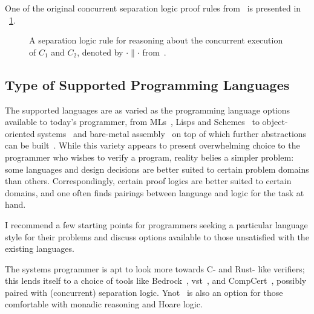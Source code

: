 One of the original concurrent separation logic proof rules
from~\cite{O_Hearn_2007} is presented in \figurename~\ref{F:CSL_ex}.

\begin{figure}
    \centering
    \caption{A separation logic rule for reasoning about the concurrent
    execution of \(C_1\) and \(C_2\), denoted by \(\cdot \parallel \cdot\)
    from~\cite{O_Hearn_2007}.}\label{F:CSL_ex}
\end{figure}

\subsection{Type of Supported Programming Languages}\label{S:t_pl}

The supported languages are as varied as the programming language options
available to today's programmer, from MLs~\cite{Coq,Kumar_2014}, Lisps and
Schemes~\cite{Torlak_2013} to object-oriented
systems~\cite{leino2008specification,leino2010dafny} and bare-metal
assembly~\cite{Chlipala_2011} on top of which further abstractions can be
built~\cite{Chlipala_2015}. While this variety appears to present overwhelming
choice to the programmer who wishes to verify a program, reality belies a
simpler problem: some languages and design decisions are better suited to
certain problem domains than others. Correspondingly, certain proof logics are
better suited to certain domains, and one often finds pairings between language
and logic for the task at hand.

I recommend a few starting points for programmers seeking a particular language
style for their problems and discuss options available to those unsatisfied with
the existing languages.

The systems programmer is apt to look more towards C- and Rust- like verifiers; this
lends itself to a choice of tools like Bedrock~\cite{Chlipala_2011},
\gls{vst}~\cite{VST}, and CompCert~\cite{Kastner-LBSSF-2017}, possibly paired
with (concurrent) separation logic. Ynot~\cite{Nanevski08ynot:reasoning} is also
an option for those comfortable with monadic reasoning and Hoare logic.

